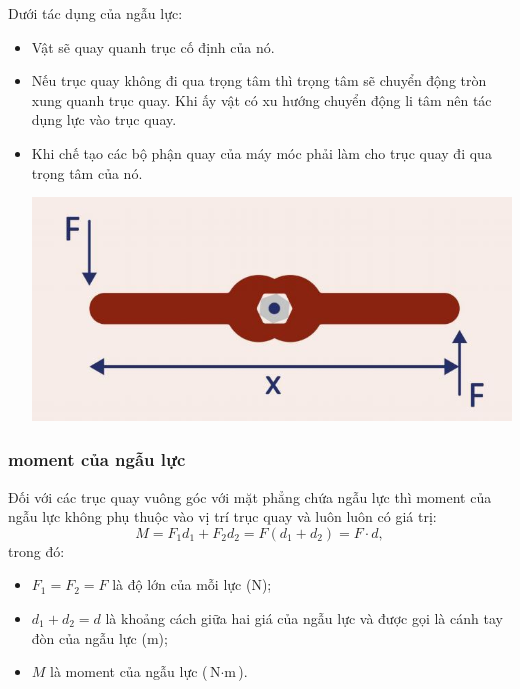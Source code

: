 Dưới tác dụng của ngẫu lực:
\begin{itemize}
	\item  Vật sẽ quay quanh trục cố định của nó. 
	\item Nếu trục quay không đi qua trọng tâm thì trọng tâm sẽ chuyển động tròn xung quanh trục quay. Khi ấy vật có xu hướng chuyển động li tâm nên tác dụng lực vào trục quay.
	\item Khi chế tạo các bộ phận quay của máy móc phải làm cho trục quay đi qua trọng tâm của nó.
	\begin{center}
		\includegraphics[scale=0.4]{../figs/VN10-PH-25-L-020-1-V2-02.JPG}
	\end{center}
\end{itemize}

\subsubsection{moment của ngẫu lực}
Đối với các trục quay vuông góc với mặt phẳng chứa ngẫu lực thì moment của ngẫu lực không phụ thuộc vào vị trí trục quay và luôn luôn có giá trị: 
\begin{equation*}
	M=F_1d_1+F_2d_2=F(d_1+d_2)=F\cdot d,
\end{equation*}
trong đó:
\begin{itemize}
	\item $F_1=F_2=F$ là độ lớn của mỗi lực ($\si{\newton}$);
	\item $d_1+d_2=d$ là khoảng cách giữa hai giá của ngẫu lực và được gọi là cánh tay đòn của ngẫu lực ($\si{\meter}$);
	\item $M$ là moment của ngẫu lực ($\si{\newton\cdot\meter}$).
\end{itemize}

